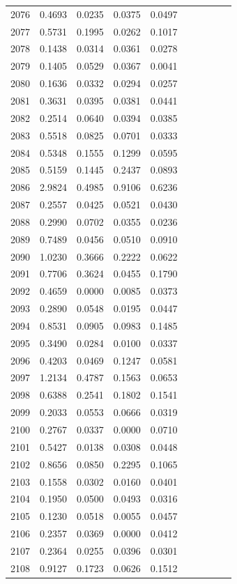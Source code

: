 \begin{table}
\begin{tabular}{cccccccccc}
2076& 0.4693& 0.0235& 0.0375& 0.0497\\ 
2077& 0.5731& 0.1995& 0.0262& 0.1017\\ 
2078& 0.1438& 0.0314& 0.0361& 0.0278\\ 
2079& 0.1405& 0.0529& 0.0367& 0.0041\\ 
2080& 0.1636& 0.0332& 0.0294& 0.0257\\ 
2081& 0.3631& 0.0395& 0.0381& 0.0441\\ 
2082& 0.2514& 0.0640& 0.0394& 0.0385\\ 
2083& 0.5518& 0.0825& 0.0701& 0.0333\\ 
2084& 0.5348& 0.1555& 0.1299& 0.0595\\ 
2085& 0.5159& 0.1445& 0.2437& 0.0893\\ 
2086& 2.9824& 0.4985& 0.9106& 0.6236\\ 
2087& 0.2557& 0.0425& 0.0521& 0.0430\\ 
2088& 0.2990& 0.0702& 0.0355& 0.0236\\ 
2089& 0.7489& 0.0456& 0.0510& 0.0910\\ 
2090& 1.0230& 0.3666& 0.2222& 0.0622\\ 
2091& 0.7706& 0.3624& 0.0455& 0.1790\\ 
2092& 0.4659& 0.0000& 0.0085& 0.0373\\ 
2093& 0.2890& 0.0548& 0.0195& 0.0447\\ 
2094& 0.8531& 0.0905& 0.0983& 0.1485\\ 
2095& 0.3490& 0.0284& 0.0100& 0.0337\\ 
2096& 0.4203& 0.0469& 0.1247& 0.0581\\ 
2097& 1.2134& 0.4787& 0.1563& 0.0653\\ 
2098& 0.6388& 0.2541& 0.1802& 0.1541\\ 
2099& 0.2033& 0.0553& 0.0666& 0.0319\\ 
2100& 0.2767& 0.0337& 0.0000& 0.0710\\ 
2101& 0.5427& 0.0138& 0.0308& 0.0448\\ 
2102& 0.8656& 0.0850& 0.2295& 0.1065\\ 
2103& 0.1558& 0.0302& 0.0160& 0.0401\\ 
2104& 0.1950& 0.0500& 0.0493& 0.0316\\ 
2105& 0.1230& 0.0518& 0.0055& 0.0457\\ 
2106& 0.2357& 0.0369& 0.0000& 0.0412\\ 
2107& 0.2364& 0.0255& 0.0396& 0.0301\\ 
2108& 0.9127& 0.1723& 0.0626& 0.1512\\ 

\end{tabular}
\end{table}
